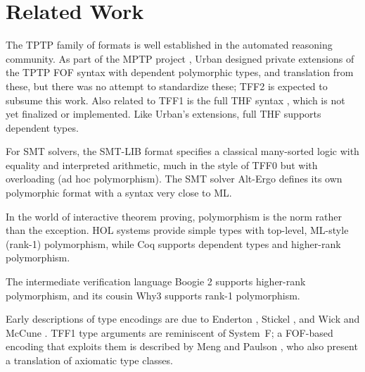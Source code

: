 \section{Related Work}
\label{sec_related_work}

The TPTP family of formats is well established in the automated reasoning
community. As part of the MPTP project \cite{urban-2006}, Urban designed private
extensions of the TPTP FOF syntax with dependent polymorphic types, and
translation from these, but there was no attempt to standardize these; TFF2 is
expected to subsume this work. Also related to TFF1 is the full THF syntax
\cite{sutcliffe-benzmueller-2010}, which is not yet finalized or implemented.
Like Urban's extensions, full THF supports dependent types.

For SMT solvers, the SMT-LIB format \cite{barrett-et-al-2010}
specifies a classical many-sorted logic with equality and interpreted
arithmetic, much in the style of TFF0 but with overloading (ad hoc
polymorphism). The SMT solver Alt-Ergo \cite{bobot-et-al-2008} defines its own
polymorphic format with a syntax very close to ML.

In the world of interactive theorem proving, polymorphism is the norm rather
than the exception. HOL systems \cite{gordon-melham-1993} provide simple types
with top-level, ML-style (rank-1) polymorphism, while Coq
\cite{bertot-casteran-2004} supports dependent types and higher-rank
polymorphism.

The intermediate verification language Boogie 2 \cite{leino-ruemmer-2010}
supports higher-rank polymorphism, and its cousin Why3 \cite{bobot-et-al-2011}
supports rank-1 polymorphism.%

Early descriptions of type encodings are due to Enderton
\cite[\S4.3]{enderton-1972}, Stickel \cite[p.~99]{stickel-1986}, and Wick and
McCune \cite[\S4]{wick-mccune-1989}. TFF1 type arguments are reminiscent of
System~F; a FOF-based encoding that exploits them is described by Meng and
Paulson \cite{meng-paulson-2008-trans}, who also present a translation of
axiomatic type classes.

